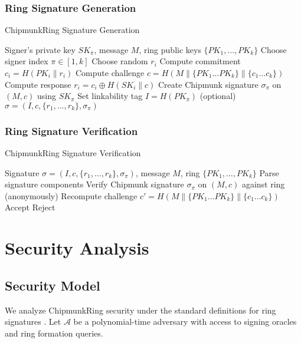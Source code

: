 \documentclass[11pt,a4paper]{article}
\begin{document}
\subsubsection{Ring Signature Generation}
\begin{algorithm}
\caption{ChipmunkRing Signature Generation}
\begin{algorithmic}[1]
\REQUIRE Signer's private key $SK_\pi$, message $M$, ring public keys $\{PK_1, \ldots, PK_k\}$
\STATE Choose signer index $\pi \in [1,k]$
    \STATE Choose random $r_i$
    \STATE Compute commitment $c_i = H(PK_i \| r_i)$
\ENDFOR
\STATE Compute challenge $c = H(M \| \{PK_1 \ldots PK_k\} \| \{c_1 \ldots c_k\})$
    \STATE Compute response $r_i = c_i \oplus H(SK_i \| c)$
\ENDFOR
\STATE Create Chipmunk signature $\sigma_\pi$ on $(M, c)$ using $SK_\pi$
\STATE Set linkability tag $I = H(PK_\pi)$ (optional)
\RETURN $\sigma = (I, c, \{r_1, \ldots, r_k\}, \sigma_\pi)$
\end{algorithmic}
\end{algorithm}

\subsubsection{Ring Signature Verification}
\begin{algorithm}
\caption{ChipmunkRing Signature Verification}
\begin{algorithmic}[1]
\REQUIRE Signature $\sigma = (I, c, \{r_1, \ldots, r_k\}, \sigma_\pi)$, message $M$, ring $\{PK_1, \ldots, PK_k\}$
\STATE Parse signature components
\STATE Verify Chipmunk signature $\sigma_\pi$ on $(M, c)$ against ring (anonymously)
\STATE Recompute challenge $c' = H(M \| \{PK_1 \ldots PK_k\} \| \{c_1 \ldots c_k\})$
    \RETURN Accept
\ELSE
    \RETURN Reject
\ENDIF
\end{algorithmic}
\end{algorithm}

\section{Security Analysis}

\subsection{Security Model}

We analyze ChipmunkRing security under the standard definitions for ring signatures \cite{rst01}. Let $\mathcal{A}$ be a polynomial-time adversary with access to signing oracles and ring formation queries.
\end{document}
